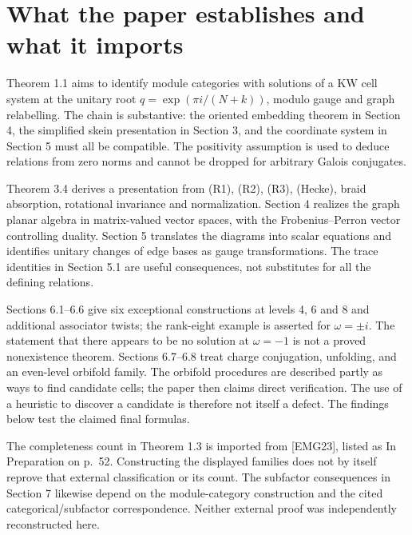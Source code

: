 \documentclass[10pt]{article}
\begin{document}
\section*{What the paper establishes and what it imports}
Theorem 1.1 aims to identify module categories with solutions of a KW cell system at the unitary root \(q=\exp(\pi i/(N+k))\), modulo gauge and graph relabelling. The chain is substantive: the oriented embedding theorem in Section 4, the simplified skein presentation in Section 3, and the coordinate system in Section 5 must all be compatible. The positivity assumption is used to deduce relations from zero norms and cannot be dropped for arbitrary Galois conjugates.\par
Theorem 3.4 derives a presentation from (R1), (R2), (R3), (Hecke), braid absorption, rotational invariance and normalization. Section 4 realizes the graph planar algebra in matrix-valued vector spaces, with the Frobenius–Perron vector controlling duality. Section 5 translates the diagrams into scalar equations and identifies unitary changes of edge bases as gauge transformations. The trace identities in Section 5.1 are useful consequences, not substitutes for all the defining relations.\par
Sections 6.1–6.6 give six exceptional constructions at levels 4, 6 and 8 and additional associator twists; the rank-eight example is asserted for \(\omega=\pm i\). The statement that there appears to be no solution at \(\omega=-1\) is not a proved nonexistence theorem. Sections 6.7–6.8 treat charge conjugation, unfolding, and an even-level orbifold family. The orbifold procedures are described partly as ways to find candidate cells; the paper then claims direct verification. The use of a heuristic to discover a candidate is therefore not itself a defect. The findings below test the claimed final formulas.\par
The completeness count in Theorem 1.3 is imported from [EMG23], listed as In Preparation on p. 52. Constructing the displayed families does not by itself reprove that external classification or its count. The subfactor consequences in Section 7 likewise depend on the module-category construction and the cited categorical/subfactor correspondence. Neither external proof was independently reconstructed here.\par
\end{document}
